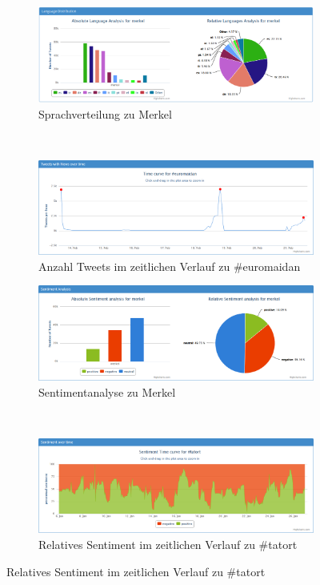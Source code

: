 \begin{figure}[h!]
\centering
\begin{subfigure}[t]{0.45\textwidth}
\includegraphics[width=\textwidth]{Bilder/Frontend/Screenshots/latestLanguageDistributionMerkel.png}
\caption{Sprachverteilung zu \glqq Merkel\grqq}
\label{fig:viewLanguageDistirbution}
\end{subfigure}
~
\begin{subfigure}[t]{0.45\textwidth}
\includegraphics[width=\textwidth]{Bilder/Frontend/Screenshots/latestTweetsPerHourEuromaidan.png}
\caption{Anzahl Tweets im zeitlichen Verlauf zu \glqq \#euromaidan\grqq}
\label{fig:viewTweetsPerHour}
\end{subfigure}

\begin{subfigure}[t]{0.45\textwidth}
\includegraphics[width=\textwidth]{Bilder/Frontend/Screenshots/latestSentimentAnalysisMerkel.png}
\caption{Sentimentanalyse zu \glqq Merkel\grqq}
\label{fig:viewSentimentAnalysis}
\end{subfigure}
~
\begin{subfigure}[t]{0.45\textwidth}
\includegraphics[width=\textwidth]{Bilder/Frontend/Screenshots/latestSentimentPerHourTatort.png}
\caption{Relatives Sentiment im zeitlichen Verlauf zu \glqq \#tatort\grqq}
\label{fig:viewSentimentPerHour}
\end{subfigure}


\end{figure}
